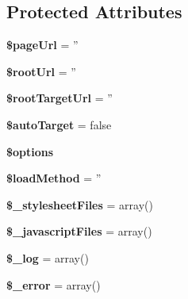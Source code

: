 \subsection*{Protected Attributes}
\begin{DoxyCompactItemize}
\item 
\hypertarget{class_js_css_chunker_ae3abf65b0d870c726d29d7d455d1d363}{
{\bfseries \$pageUrl} = ''}
\label{class_js_css_chunker_ae3abf65b0d870c726d29d7d455d1d363}

\item 
\hypertarget{class_js_css_chunker_a0de279007713709c32cdf155ad3c63cd}{
{\bfseries \$rootUrl} = ''}
\label{class_js_css_chunker_a0de279007713709c32cdf155ad3c63cd}

\item 
\hypertarget{class_js_css_chunker_a4b16bd5e396c7c72ca3943031ef3d8f8}{
{\bfseries \$rootTargetUrl} = ''}
\label{class_js_css_chunker_a4b16bd5e396c7c72ca3943031ef3d8f8}

\item 
\hypertarget{class_js_css_chunker_a756d9d88cb9a3791995084d49fe12cb5}{
{\bfseries \$autoTarget} = false}
\label{class_js_css_chunker_a756d9d88cb9a3791995084d49fe12cb5}

\item 
{\bfseries \$options}
\item 
\hypertarget{class_js_css_chunker_a5b880532e37c7e3b132f740632954a7f}{
{\bfseries \$loadMethod} = ''}
\label{class_js_css_chunker_a5b880532e37c7e3b132f740632954a7f}

\item 
\hypertarget{class_js_css_chunker_a755b28b6020ab9afb1cde7628d598c68}{
{\bfseries \$\_\-stylesheetFiles} = array()}
\label{class_js_css_chunker_a755b28b6020ab9afb1cde7628d598c68}

\item 
\hypertarget{class_js_css_chunker_aadec56975ea586eabb530a7d56919819}{
{\bfseries \$\_\-javascriptFiles} = array()}
\label{class_js_css_chunker_aadec56975ea586eabb530a7d56919819}

\item 
\hypertarget{class_js_css_chunker_a79502c2fc75b67c831e8aab175f55e76}{
{\bfseries \$\_\-log} = array()}
\label{class_js_css_chunker_a79502c2fc75b67c831e8aab175f55e76}

\item 
\hypertarget{class_js_css_chunker_acce511121b059a08c6ceceae174ce261}{
{\bfseries \$\_\-error} = array()}
\label{class_js_css_chunker_acce511121b059a08c6ceceae174ce261}


\end{DoxyCompactItemize}
